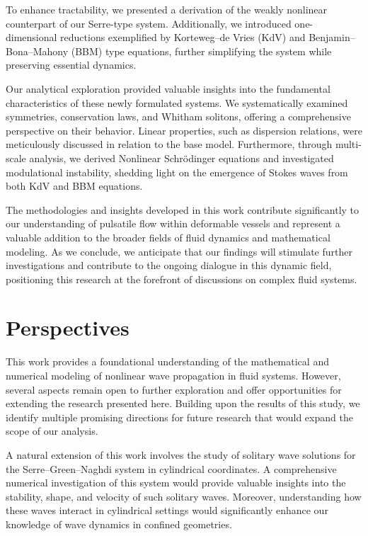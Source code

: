 \documentclass[alpha-refs, 12pt]{wiley-article}
\begin{document}
To enhance tractability, we presented a derivation of the weakly nonlinear counterpart of our Serre-type system. Additionally, we introduced one-dimensional reductions exemplified by Korteweg--de Vries (KdV) and Benjamin--Bona--Mahony (BBM) type equations, further simplifying the system while preserving essential dynamics.

Our analytical exploration provided valuable insights into the fundamental characteristics of these newly formulated systems. We systematically examined symmetries, conservation laws, and Whitham solitons, offering a comprehensive perspective on their behavior. Linear properties, such as dispersion relations, were meticulously discussed in relation to the base model. Furthermore, through multi-scale analysis, we derived Nonlinear Schrödinger equations and investigated modulational instability, shedding light on the emergence of Stokes waves from both KdV and BBM equations.

The methodologies and insights developed in this work contribute significantly to our understanding of pulsatile flow within deformable vessels and represent a valuable addition to the broader fields of fluid dynamics and mathematical modeling. As we conclude, we anticipate that our findings will stimulate further investigations and contribute to the ongoing dialogue in this dynamic field, positioning this research at the forefront of discussions on complex fluid systems.

\section{Perspectives}

This work provides a foundational understanding of the mathematical and numerical modeling of nonlinear wave propagation in fluid systems. However, several aspects remain open to further exploration and offer opportunities for extending the research presented here. Building upon the results of this study, we identify multiple promising directions for future research that would expand the scope of our analysis.

A natural extension of this work involves the study of solitary wave solutions for the Serre--Green--Naghdi system in cylindrical coordinates. A comprehensive numerical investigation of this system would provide valuable insights into the stability, shape, and velocity of such solitary waves. Moreover, understanding how these waves interact in cylindrical settings would significantly enhance our knowledge of wave dynamics in confined geometries.
\end{document}
